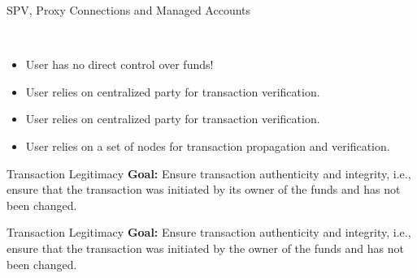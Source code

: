 \documentclass[]{beamer}
\begin{document}
\begin{frame}{SPV, Proxy Connections and Managed Accounts}

 \\ \vspace{1em}

	
	\begin{itemize}
		\item<2-> User has no direct control over funds!
		\item<2-> User relies on centralized party for transaction verification.
	\end{itemize}

	\vspace{1em}	
		
		
		\begin{itemize}
		\item<3-> User relies on centralized party for transaction verification.
	\end{itemize}		
	
	\vspace{1em}
	
	
	\begin{itemize}
		\item<4-> User relies on a set of nodes for transaction propagation and verification.

	\end{itemize}
	

	
\end{frame}


\begin{frame}{Transaction Legitimacy}
\textbf{Goal:} Ensure transaction \color{focus}authenticity \color{black}and \color{focus} integrity\color{black}, i.e., ensure that the transaction was initiated by its owner of the funds and has not been changed.
\uncover<2->{
		\center
		
		}
\uncover<3->{
		\vspace{1em}
		
	}
\end{frame}

\begin{frame}{Transaction Legitimacy}
\textbf{Goal:} Ensure transaction \color{focus}authenticity \color{black}and \color{focus} integrity\color{black}, i.e., ensure that the transaction was initiated by the owner of the funds and has not been changed.
\uncover<2->{
		\center
		
		}
\uncover<3->{
		\vspace{2em}
		
	}
\end{frame}
\end{document}
